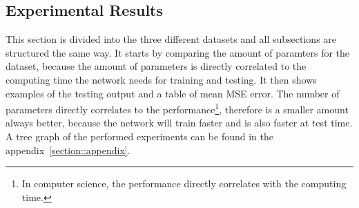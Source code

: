  \subsection{Experimental Results} \label{subsection::exp_results}
  This section is divided into the three different datasets and all subsections are structured the same way. It starts by comparing the amount of paramters
  for the dataset, because the amount of parameters is directly correlated to the computing time the network needs for training and testing. It then shows
  examples of the testing output and a table of mean MSE error.
  The number of parameters directly correlates to the performance\footnote{In computer science, the performance directly correlates with the computing time.}, 
  therefore is a smaller amount always better, because the network will train faster and is also faster at test time. A tree graph of the performed experiments
  can be found in the appendix~\ref{section::appendix}.
  
